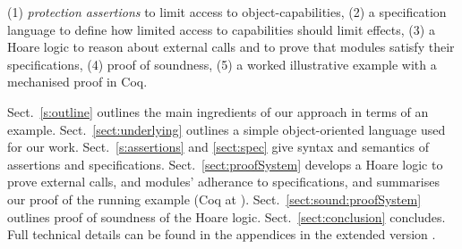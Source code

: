  

 
(1) \emph{protection assertions} to limit access to object-capabilities, %
(2) a specification language to define how limited access to capabilities should limit effects, %
(3) a Hoare logic to reason about external calls and to prove that modules satisfy their %
specifications,
(4) proof of soundness,
(5) a worked illustrative example {with a mechanised proof in Coq}.
 

Sect.\ \ref{s:outline}   outlines the main ingredients of our approach in terms of an {example}.
Sect.\ \ref{sect:underlying} outlines a simple object-oriented language used for our work. 
Sect.\ \ref{s:assertions} and 
\ref{sect:spec}  give syntax and semantics of assertions  and  specifications.
Sect.\ \ref{sect:proofSystem} develops a Hoare logic  
 to prove external calls, and modules' adherance to  specifications, and summarises our  proof
  of  the running example 
 (Coq  at \cite{CoqOOPSLA25}).
Sect.\ \ref{sect:sound:proofSystem} outlines %
proof of soundness of
the Hoare logic. 
 Sect.\ \ref{sect:conclusion} concludes. %
Full  technical details can be found in the appendices 
{in the extended version \cite{externalCallsFull}.}

